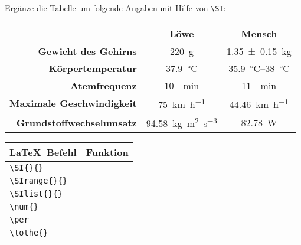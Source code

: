 \begin{frame}[fragile]
	\vspace{-0.3cm}
	\begin{Aufgabe}
		Ergänze die Tabelle um folgende Angaben mit Hilfe von \lstinline[basicstyle=\normalfont\normalsize]|\SI|:
	\end{Aufgabe}
	\begin{outputbox}
		\begin{center}
			\begin{tabular}{rcc}
				\hline
				&	\textbf{Löwe}										& \textbf{Mensch} 						\\ \hline
				\textbf{Gewicht des Gehirns}		&	\SI{220}{\g}										& \SI{1.35 \pm 0.15}{\kg}				\\ 
				\textbf{Körpertemperatur}			&	\SI{37.9}{\degreeCelsius}							& \SIrange{35.9}{38}{\degreeCelsius}	\\
				\textbf{Atemfrequenz}				&	\SI{10}{\per \minute}								& \SI{11}{\per\minute} 					\\
				\textbf{Maximale Geschwindigkeit}	&	\SI{75}{\km\per\hour}								& \SI{44.46}{\km\per\hour} 				\\ 
				\textbf{Grundstoffwechselumsatz}	&	\SI{94.58}{\kg\metre\squared\per\second\tothe{3}}	&  \SI{82.78}{\watt}\\
				\hline
			\end{tabular}
		\end{center}
	\end{outputbox}

	\btVFill\Befehle
	\begin{center}
		\begin{tabular}{ll}
			\toprule
			\LaTeX\ Befehl				&	Funktion						\\ \midrule
			\lstinline|\SI{}{}|			&									\\
			\lstinline|\SIrange{}{}|	&									\\
			\lstinline|\SIlist{}{}|		&									\\
			\lstinline|\num{}|			&									\\
			\lstinline|\per|			&									\\
			\lstinline|\tothe{}|		&									\\
			\bottomrule
		\end{tabular}
	\end{center}
	\vspace{0.1cm}
\end{frame}
